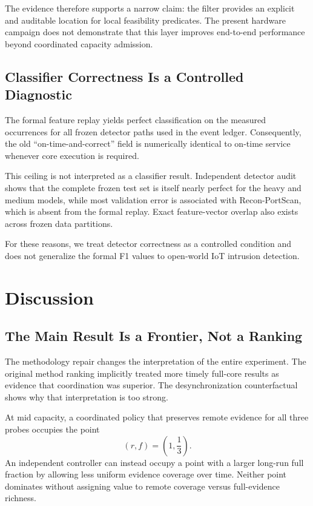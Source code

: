 \documentclass[10pt,journal]{IEEEtran}
\begin{document}
The evidence therefore supports a narrow claim: the filter provides an
explicit and auditable location for local feasibility predicates.
The present hardware campaign does not demonstrate that this layer
improves end-to-end performance beyond coordinated capacity admission.

\subsection{Classifier Correctness Is a Controlled Diagnostic}

The formal feature replay yields perfect classification on the measured
occurrences for all frozen detector paths used in the event ledger.
Consequently, the old ``on-time-and-correct'' field is numerically
identical to on-time service whenever core execution is required.

This ceiling is not interpreted as a classifier result. Independent
detector audit shows that the complete frozen test set is itself nearly
perfect for the heavy and medium models, while most validation error is
associated with Recon-PortScan, which is absent from the formal replay.
Exact feature-vector overlap also exists across frozen data partitions.

For these reasons, we treat detector correctness as a controlled
condition and does not generalize the formal F1 values to open-world IoT
intrusion detection.

\section{Discussion}
\label{sec:discussion}

\subsection{The Main Result Is a Frontier, Not a Ranking}

The methodology repair changes the interpretation of the entire
experiment. The original method ranking implicitly treated more timely
full-core results as evidence that coordination was superior. The
desynchronization counterfactual shows why that interpretation is too
strong.

At mid capacity, a coordinated policy that preserves remote evidence
for all three probes occupies the point
\[
(r,f)=\left(1,\frac13\right).
\]
An independent controller can instead occupy a point with a larger
long-run full fraction by allowing less uniform evidence coverage over
time. Neither point dominates without assigning value to remote coverage
versus full-evidence richness.
\end{document}
